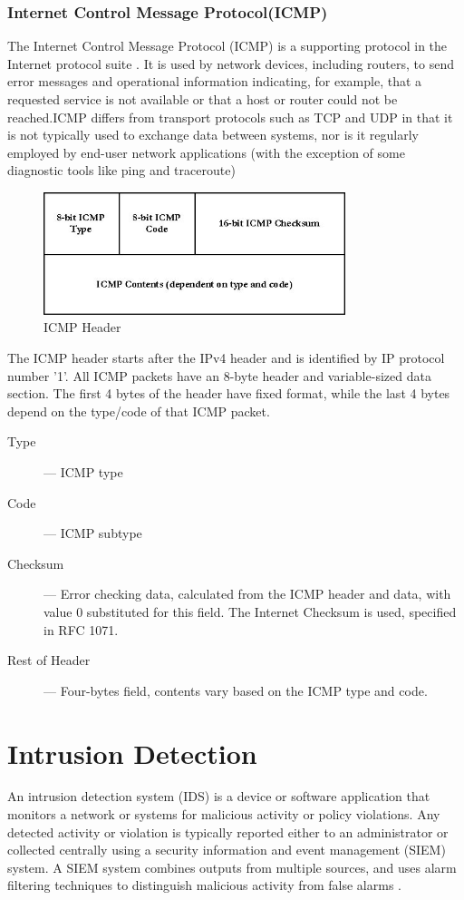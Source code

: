 \documentclass[12pt]{article}
\theoremstyle{definition}
\begin{document}
			\subsubsection{Internet Control Message Protocol(ICMP)}
			The Internet Control Message Protocol (ICMP) is a supporting protocol in the Internet protocol suite \cite{So-In2016}. It is used by network devices, including routers, to send error messages and operational information indicating, for example, that a requested service is not available or that a host or router could not be reached.ICMP differs from transport protocols such as TCP and UDP in that it is not typically used to exchange data between systems, nor is it regularly employed by end-user network applications (with the exception of some diagnostic tools like ping and traceroute)
			
			\begin{figure}[!h]
				\centering
				\includegraphics[width=250pt]{pictures/icmp_header.png}
				\caption{ICMP Header}
				\label{fig:icmp-header}
			\end{figure}
			The ICMP header starts after the IPv4 header and is identified by IP protocol number '1'. All ICMP packets have an 8-byte header and variable-sized data section. The first 4 bytes of the header have fixed format, while the last 4 bytes depend on the type/code of that ICMP packet.
			
			
			\begin{description}
				\item [Type ] --- ICMP type
				\item [Code ] --- ICMP subtype
				\item [Checksum] --- Error checking data, calculated from the ICMP header and data, with value 0 substituted for this field. The Internet Checksum is used, specified in RFC 1071.
				\item [Rest of Header] --- Four-bytes field, contents vary based on the ICMP type and code.
			\end{description}
			
	
	\cleardoublepage
	\section{Intrusion Detection}\label{sec:i-detection}
		An intrusion detection system (IDS) is a device or software application that monitors a network or systems for malicious activity or policy violations. Any detected activity or violation is typically reported either to an administrator or collected centrally using a security information and event management (SIEM) system. A SIEM system combines outputs from multiple sources, and uses alarm filtering techniques to distinguish malicious activity from false alarms \cite{Takenaka2016}.
		
\end{document}
